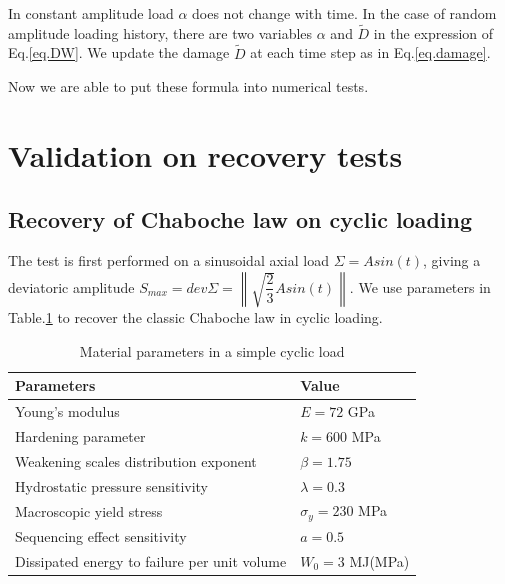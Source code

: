 \documentclass[3p,times,number,review]{elsarticle}
\begin{document}
In constant amplitude load $\alpha$ does not change with time. In the case of random amplitude loading history, there are two variables $\alpha$ and $\tilde{D}$ in the expression of Eq.\eqref{eq.DW}.  We update the damage $\tilde{D}$ at each time step as in Eq.\eqref{eq.damage}.

Now we are able to put these formula into numerical tests.


\newpage
\section{Validation on recovery tests}
\subsection{Recovery of Chaboche law on cyclic loading}
The test is first performed on a sinusoidal axial load $\Sigma=Asin(t)$, giving a deviatoric amplitude $S_{max}=dev\Sigma=\left\| \sqrt{\dfrac{2}{3}}Asin(t)\right\| $. We use parameters in Table.\ref{tab:Sin} to recover the classic Chaboche law in cyclic loading.
\begin{table}[!h]
	\centering
	\begin{tabular}{ll}
		\hline
		\textbf{Parameters}                                         & \textbf{Value}                    \\ \hline
Young's modulus                                             & $E=72$ GPa                       \\
Hardening parameter                                         &  $k=600$ MPa \\
Weakening scales distribution exponent                      & $\beta=1.75$                             \\
Hydrostatic pressure sensitivity                            & $\lambda=0.3$                     \\
Macroscopic yield stress                                    & $\sigma_y=230$ MPa              \\
Sequencing effect sensitivity                               & $a=0.5$                        \\
Dissipated energy to failure per unit volume                & $W_0=3$ MJ(MPa)                       \\ \hline
	\end{tabular}
		\caption{Material parameters in a simple cyclic load }
		\label{tab:Sin}
\end{table}
\end{document}
